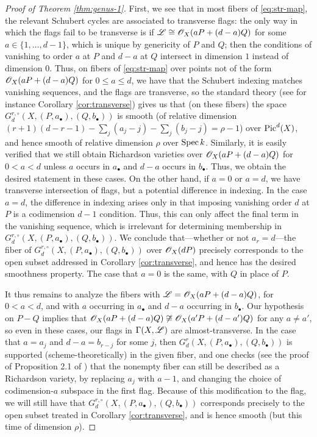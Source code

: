 \documentclass{amsart}
\begin{document}
\begin{proof}[Proof of Theorem \ref{thm:genus-1}]
First, we see that in most fibers of \eqref{eq:str-map}, the relevant 
Schubert cycles are associated to transverse flags:
the only way in which the flags fail to be transverse is if 
${\mathscr L} \cong {\mathscr O}_X(aP+(d-a)Q)$ for some $a\in\{1,\ldots,d-1\}$, which is 
unique by genericity of $P$ and $Q$; then the conditions of
vanishing to order $a$ at $P$ and $d-a$ at $Q$ intersect in dimension $1$
instead of dimension $0$. Thus, on fibers of \eqref{eq:str-map}
over points not of the form 
${\mathscr O}_X(aP+(d-a)Q)$ for $0 \leq a \leq d$, we have that the Schubert indexing
matches vanishing sequences, and the flags are transverse, so
the standard theory (see for instance Corollary \ref{cor:transverse})
gives us that (on these fibers) the space
$G^{r,\circ}_d(X,(P,a_{\bullet}),(Q,b_{\bullet}))$ is smooth (of 
relative dimension $(r+1)(d-r-1)-\sum_j (a_j-j)-\sum_j (b_j-j) = \rho-1$) over
$\operatorname{Pic}^d(X)$, and hence smooth of relative dimension $\rho$ 
over $\operatorname{Spec} k$. Similarly, it is easily
verified that we still obtain Richardson varieties over ${\mathscr O}_X(aP+(d-a)Q)$ 
for $0<a<d$
unless $a$ occurs in $a_{\bullet}$ and $d-a$ occurs in $b_{\bullet}$.
Thus, we obtain the desired statement in these cases.
On the other hand, if $a=0$ or $a=d$, we have transverse intersection of
flags, but a potential difference in indexing. In the case $a=d$, the
difference in indexing arises only in that imposing vanishing order $d$ at 
$P$ is a codimension $d-1$ condition. Thus, this can only affect the final
term in the vanishing sequence, which is irrelevant for determining 
membership in 
$G^{r,\circ}_d(X,(P,a_{\bullet}),(Q,b_{\bullet}))$. We conclude 
that---whether or not $a_r=d$---the fiber of 
$G^{r,\circ}_d(X,(P,a_{\bullet}),(Q,b_{\bullet}))$ over
${\mathscr O}_X(dP)$ precisely corresponds to the open subset addressed
in Corollary \ref{cor:transverse}, and hence has the desired smoothness
property. The case that $a=0$ is the same, with $Q$ in place of $P$.

It thus remains to analyze the fibers with ${\mathscr L}={\mathscr O}_X(aP+(d-a)Q)$, for 
$0<a<d$, and with $a$ 
occurring in $a_{\bullet}$ and $d-a$ occurring in $b_{\bullet}$. 
Our hypothesis on $P-Q$ implies that 
${\mathscr O}_X(aP+(d-a)Q) \not \cong {\mathscr O}_X(a'P+(d-a')Q)$ for any $a \neq a'$,
so even in these cases, our flags in $\Gamma(X,{\mathscr L})$ are almost-transverse.
In the case that $a=a_j$ and $d-a=b_{r-j}$ for some $j$, then
$G^r_d(X,(P,a_{\bullet}),(Q,b_{\bullet}))$ is supported 
(scheme-theoretically) in the given fiber, and one checks (see 
the proof of Proposition 2.1 of \cite{os26}) that the nonempty fiber can still 
be described as a Richardson variety, by replacing $a_j$ with $a-1$, and
changing the choice of codimension-$a$ subspace in the first flag. Because
of this modification to the flag, we will still have that
$G^{r,\circ}_d(X,(P,a_{\bullet}),(Q,b_{\bullet}))$ corresponds precisely to 
the open subset treated in Corollary \ref{cor:transverse}, and is hence 
smooth (but this time of dimension $\rho$).


\end{proof}
\end{document}
